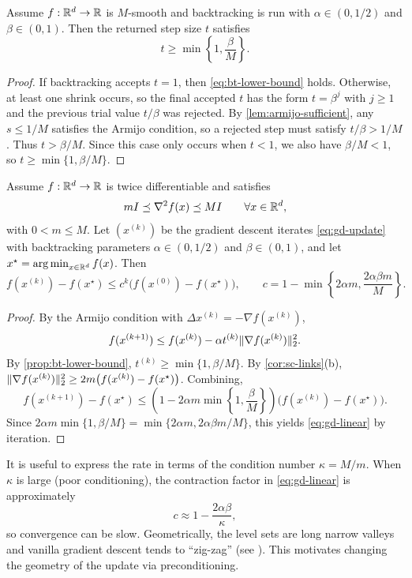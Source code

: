 \begin{proposition}
\label{prop:bt-lower-bound}
Assume $f:\mathbb{R}^d\to\mathbb{R}$ is $M$-smooth and backtracking is run with $\alpha \in (0,1/2)$ and $\beta \in (0,1)$.
Then the returned step size $t$ satisfies
\begin{equation}
  t \ge \min\left\{1,\frac{\beta}{M}\right\}.
  \label{eq:bt-lower-bound}
\end{equation}
\end{proposition}
\begin{proof}
If backtracking accepts $t=1$, then \eqref{eq:bt-lower-bound} holds.
Otherwise, at least one shrink occurs, so the final accepted $t$ has the form $t=\beta^j$ with $j\ge 1$ and the previous trial value $t/\beta$ was rejected.
By \cref{lem:armijo-sufficient}, any $s\le 1/M$ satisfies the Armijo condition, so a rejected step must satisfy $t/\beta > 1/M$.
Thus $t > \beta/M$.
Since this case only occurs when $t<1$, we also have $\beta/M < 1$, so $t \ge \min\{1,\beta/M\}$.
\end{proof}

\begin{theorem}
\label{thm:gd-linear}
Assume $f:\mathbb{R}^d\to\mathbb{R}$ is twice differentiable and satisfies
\[
  m I \preceq \nabla^2 f(x) \preceq M I \qquad \forall x \in \mathbb{R}^d,
\]
with $0<m\le M$.
Let $(x^{(k)})$ be the gradient descent iterates \eqref{eq:gd-update} with backtracking parameters $\alpha \in (0,1/2)$ and $\beta \in (0,1)$, and let $x^\star=\operatorname*{arg\,min}_{x\in\mathbb{R}^d} f(x)$.
Then
\begin{equation}
  f(x^{(k)}) - f(x^\star)
  \le c^k \bigl(f(x^{(0)}) - f(x^\star)\bigr),
  \qquad
  c = 1 - \min\left\{2\alpha m, \frac{2\alpha\beta m}{M}\right\}.
  \label{eq:gd-linear}
\end{equation}
\end{theorem}
\begin{proof}
By the Armijo condition with $\Delta x^{(k)}=-\nabla f(x^{(k)})$,
\[
f(x^{(k+1)}) \le f(x^{(k)}) - \alpha t^{(k)} \lVert\nabla f(x^{(k)})\rVert_2^2.
\]
By \cref{prop:bt-lower-bound}, $t^{(k)} \ge \min\{1,\beta/M\}$.
By \cref{cor:sc-links}(b), $\lVert\nabla f(x^{(k)})\rVert_2^2 \ge 2m\bigl(f(x^{(k)})-f(x^\star)\bigr)$.
Combining,
\[
f(x^{(k+1)})-f(x^\star)
\le \left(1 - 2\alpha m \min\left\{1,\frac{\beta}{M}\right\}\right)\bigl(f(x^{(k)})-f(x^\star)\bigr).
\]
Since $2\alpha m \min\{1,\beta/M\} = \min\{2\alpha m, 2\alpha\beta m/M\}$, this yields \eqref{eq:gd-linear} by iteration.
\end{proof}

It is useful to express the rate in terms of the condition number $\kappa=M/m$.
When $\kappa$ is large (poor conditioning), the contraction factor in \eqref{eq:gd-linear} is approximately
\[
c \approx 1 - \frac{2\alpha\beta}{\kappa},
\]
so convergence can be slow.
Geometrically, the level sets are long narrow valleys and vanilla gradient descent tends to ``zig-zag'' (see \citet[\S9.3 and Ex.~9.3.2]{boyd_vandenberghe_2004_convex}).
This motivates changing the geometry of the update via preconditioning.

